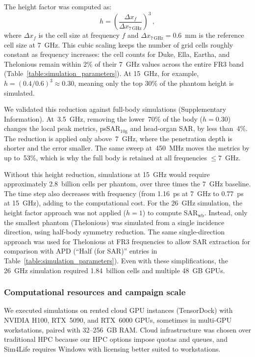 \documentclass{iopjournal}
\begin{document}
The height factor was computed as:
\begin{equation}
h = \left(\frac{\Delta x_f}{\Delta x_{7\,\mathrm{GHz}}}\right)^3 \,,
\end{equation}
where $\Delta x_f$ is the cell size at frequency $f$ and $\Delta x_{7\,\mathrm{GHz}} = 0.6$~mm is the reference cell size at 7~GHz.
This cubic scaling keeps the number of grid cells roughly constant as frequency increases: the cell counts for Duke, Ella, Eartha, and Thelonious remain within 2\% of their 7~GHz values across the entire FR3 band (Table~\ref{table:simulation_parameters}).
At 15~GHz, for example, $h = (0.4/0.6)^3 \approx 0.30$, meaning only the top 30\% of the phantom height is simulated.

We validated this reduction against full-body simulations (Supplementary Information).
At~3.5~GHz, removing the lower~70\% of the body ($h=0.30$) changes the local peak metrics, psSAR$_{10\mathrm{g}}$ and head-organ \gls{SAR}, by less than~4\%.
The reduction is applied only above~7~GHz, where the penetration depth is shorter and the error smaller.
The same sweep at~450~MHz moves the metrics by up to~53\%, which is why the full body is retained at all frequencies $\le 7$~GHz.

Without this height reduction, simulations at 15~GHz would require approximately 2.8~billion cells per phantom, over three times the 7~GHz baseline.
The time step also decreases with frequency (from 1.16~ps at 7~GHz to 0.77~ps at 15~GHz), adding to the computational cost.
For the 26~GHz simulation, the height factor approach was not applied ($h = 1$) to compute SAR$_\mathrm{wb}$.
Instead, only the smallest phantom (Thelonious) was simulated from a single incidence direction, using half-body symmetry reduction.
The same single-direction approach was used for Thelonious at FR3 frequencies to allow \gls{SAR} extraction for comparison with APD (``Half (for SAR)'' entries in Table~\ref{table:simulation_parameters}).
Even with these simplifications, the 26~GHz simulation required 1.84~billion cells and multiple 48~GB GPUs.

\subsubsection{Computational resources and campaign scale}
We executed simulations on rented cloud GPU instances (TensorDock) with NVIDIA H100, RTX~5090, and RTX~6000 GPUs, sometimes in multi-GPU workstations, paired with 32--256~GB RAM.
Cloud infrastructure was chosen over traditional \gls{HPC} because our \gls{HPC} options impose quotas and queues, and Sim4Life requires Windows with licensing better suited to workstations.
\end{document}
